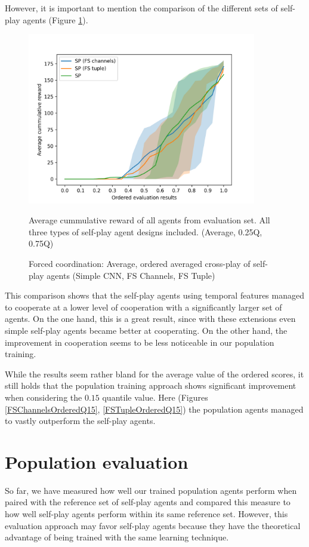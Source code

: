 However, it is important to mention the comparison of the different sets of self-play agents (Figure \ref{FSVariantsOrderedAvg}).
\begin{figure}[!ht]
    \centering
    \includegraphics*[width=10cm]{../img/FSVariantsOrderedAvg.png}

    \caption{Forced coordination: Average, ordered averaged cross-play of self-play agents (Simple CNN, FS Channels, FS Tuple)}
    \label{FSVariantsOrderedAvg}
    \medskip
    \small 
    Average cummulative reward of all agents from evaluation set.
    All three types of self-play agent designs included.
    (Average, 0.25Q, 0.75Q)

\end{figure}
This comparison shows that the self-play agents using temporal features managed to cooperate at a lower level of cooperation with a significantly larger set of agents.
On the one hand, this is a great result, since with these extensions even simple self-play agents became better at cooperating.
On the other hand, the improvement in cooperation seems to be less noticeable in our population training.

While the results seem rather bland for the average value of the ordered scores, it still holds that the population training approach shows significant improvement when considering the $0.15$ quantile value.
Here (Figures \ref{FSChannelsOrderedQ15}, \ref{FSTupleOrderedQ15}) the population agents managed to vastly outperform the self-play agents.



\section{Population evaluation}
So far, we have measured how well our trained population agents perform when paired with the reference set of self-play agents and compared this measure to how well self-play agents perform within its same reference set.
However, this evaluation approach may favor self-play agents because they have the theoretical advantage of being trained with the same learning technique.

